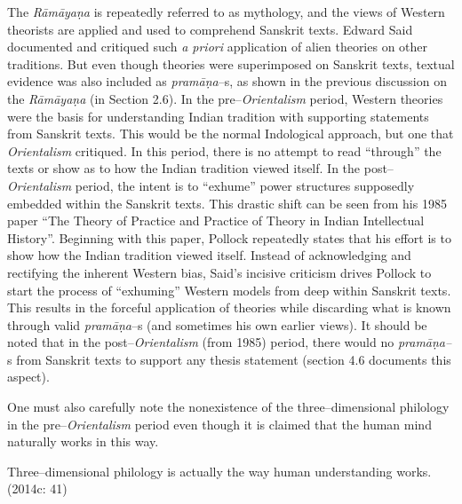 The \textit{Rāmāyaṇa }is repeatedly referred to as mythology, and the views of Western theorists are applied and used to comprehend Sanskrit texts. Edward Said documented and critiqued such \textit{a priori} application of alien theories on other traditions. But even though theories were superimposed on Sanskrit texts, textual evidence was also included as \textit{pramāṇa}–s, as shown in the previous discussion on the \textit{Rāmāyaṇa }(in Section 2.6). In the pre–\textit{Orientalism} period, Western theories were the basis for understanding Indian tradition with supporting statements from Sanskrit texts. This would be the normal Indological approach, but one that \textit{Orientalism }critiqued. In this period, there is no attempt to read “through” the texts or show as to how the Indian tradition viewed itself. In the post–\textit{Orientalism} period, the intent is to “exhume” power structures supposedly embedded within the Sanskrit texts. This drastic shift can be seen from his 1985 paper “The Theory of Practice and Practice of Theory in Indian Intellectual History”. Beginning with this paper, Pollock repeatedly states that his effort is to show how the Indian tradition viewed itself. Instead of acknowledging and rectifying the inherent Western bias, Said’s incisive criticism drives Pollock to start the process of “exhuming” Western models from deep within Sanskrit texts. This results in the forceful application of theories while discarding what is known through valid \textit{pramāṇa}–s (and sometimes his own earlier views). It should be noted that in the post–\textit{Orientalism} (from 1985) period, there would no\textit{ pramāṇa–}s from Sanskrit texts to support any thesis statement (section 4.6 documents this aspect).

One must also carefully note the nonexistence of the three–dimensional philology in the pre–\textit{Orientalism} period even though it is claimed that the human mind naturally works in this way.

\begin{myquote}
Three–dimensional philology is actually the way human understanding works. (2014c: 41)
\end{myquote}


